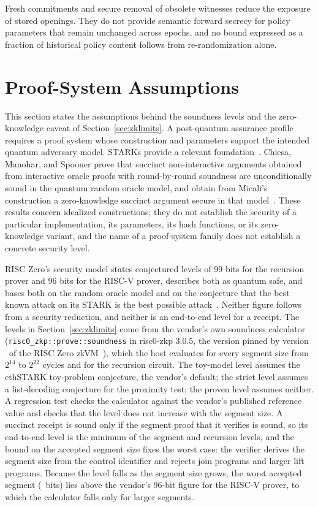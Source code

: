 \documentclass[journal]{IEEEtran}
\newcommand{\code}[1]{\texttt{\footnotesize #1}}
\begin{document}
Fresh commitments and secure removal of obsolete witnesses reduce the exposure of stored openings. They do not provide semantic forward secrecy for policy parameters that remain unchanged across epochs, and no bound expressed as a fraction of historical policy content follows from re-randomization alone.

\section{Proof-System Assumptions}
\label{s:zkpq}
This section states the assumptions behind the soundness levels and the zero-knowledge caveat of Section~\ref{sec:zklimits}. A post-quantum assurance profile requires a proof system whose construction and parameters support the intended quantum adversary model. STARKs provide a relevant foundation~\cite{stark}. Chiesa, Manohar, and Spooner prove that succinct non-interactive arguments obtained from interactive oracle proofs with round-by-round soundness are unconditionally sound in the quantum random oracle model, and obtain from Micali's construction a zero-knowledge succinct argument secure in that model~\cite{cms}. These results concern idealized constructions; they do not establish the security of a particular implementation, its parameters, its hash functions, or its zero-knowledge variant, and the name of a proof-system family does not establish a concrete security level.

RISC Zero's security model states conjectured levels of 99 bits for the recursion prover and 96 bits for the RISC-V prover, describes both as quantum safe, and bases both on the random oracle model and on the conjecture that the best known attack on its STARK is the best possible attack~\cite{risc0sec}. Neither figure follows from a security reduction, and neither is an end-to-end level for a receipt. The levels in Section~\ref{sec:zklimits} come from the vendor's own soundness calculator (\code{risc0\_zkp::prove::soundness} in risc0-zkp 3.0.5, the version pinned by version \ZkVersion\ of the RISC Zero zkVM~\cite{risc0}), which the host evaluates for every segment size from $2^{14}$ to $2^{22}$ cycles and for the recursion circuit. The toy-model level assumes the ethSTARK toy-problem conjecture, the vendor's default; the strict level assumes a list-decoding conjecture for the proximity test; the proven level assumes neither. A regression test checks the calculator against the vendor's published reference value and checks that the level does not increase with the segment size. A succinct receipt is sound only if the segment proof that it verifies is sound, so its end-to-end level is the minimum of the segment and recursion levels, and the bound on the accepted segment size fixes the worst case: the verifier derives the segment size from the control identifier and rejects join programs and larger lift programs. Because the level falls as the segment size grows, the worst accepted segment (\ZkSegBits~bits) lies above the vendor's 96-bit figure for the RISC-V prover, to which the calculator falls only for larger segments.
\end{document}
